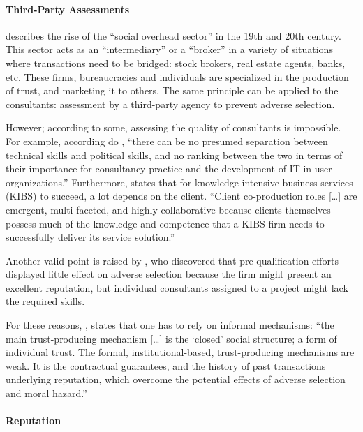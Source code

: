 \documentclass[12pt]{article}
\begin{document}
\paragraph{Third-Party Assessments}\label{third-party-assessments}

\citet[57-62]{zucker1985} describes the rise of the ``social overhead
sector'' in the 19th and 20th century. This sector acts as an
``intermediary'' or a ``broker'' in a variety of situations where
transactions need to be bridged: stock brokers, real estate agents,
banks, etc. These firms, bureaucracies and individuals are specialized
in the production of trust, and marketing it to others. The same
principle can be applied to the consultants: assessment by a third-party
agency to prevent adverse selection.

However; according to some, assessing the quality of consultants is
impossible. For example, according do \citet[40]{bloomfield1995},
``there can be no presumed separation between technical skills and
political skills, and no ranking between the two in terms of their
importance for consultancy practice and the development of IT in user
organizations.'' Furthermore, \citet[101-102]{bettencourt2002} states
that for knowledge-intensive business services (KIBS) to succeed, a lot
depends on the client. ``Client co-production roles {[}\ldots{]} are
emergent, multi-faceted, and highly collaborative because clients
themselves possess much of the knowledge and competence that a KIBS firm
needs to successfully deliver its service solution.''

Another valid point is raised by \citet[23]{basu2011} , who discovered
that pre-qualification efforts displayed little effect on adverse
selection because the firm might present an excellent reputation, but
individual consultants assigned to a project might lack the required
skills.

For these reasons, \citet[250]{clark1993}, states that one has to rely
on informal mechanisms: ``the main trust-producing mechanism
{[}\ldots{]} is the `closed' social structure; a form of individual
trust. The formal, institutional-based, trust-producing mechanisms are
weak. It is the contractual guarantees, and the history of past
transactions underlying reputation, which overcome the potential effects
of adverse selection and moral hazard.''

\paragraph{Reputation}\label{reputation}
\end{document}
